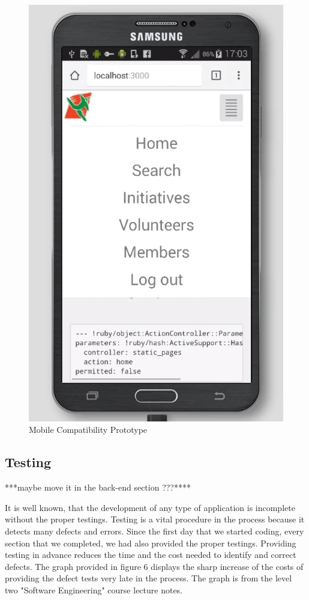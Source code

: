 \documentclass{l3proj}
\begin{document}
\begin{figure}
  \centerline{\includegraphics[width=\textwidth, height=\textheight, keepaspectratio]{mobilePrototype.png}}
  \caption{Mobile Compatibility Prototype}
\end{figure}

\subsection{Testing}
\label{testing}
***maybe move it in the back-end section ???****

It is well known, that the development of any type of application is incomplete without the proper testings. Testing is a vital procedure in the process because it detects many defects and errors. Since the first day that we started coding, every section that we completed, we had also provided the proper testings. Providing testing in advance reduces the time and the cost needed to identify and correct defects. The graph provided in figure 6 displays the sharp increase of the costs of providing the defect tests very late in the process. The graph is from the level two "Software Engineering" course lecture notes.
\end{document}
